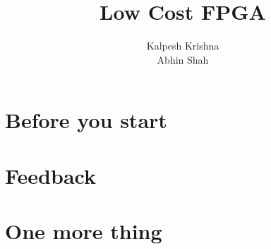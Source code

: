 \documentclass[11pt]{article}
\title{\textbf{Low Cost FPGA}}
\author{Kalpesh Krishna\\
		Abhin Shah}
\date{}
\begin{document}
\maketitle

\section{Before you start}

 

\section{Feedback}


\section{One more thing}
\end{document}
